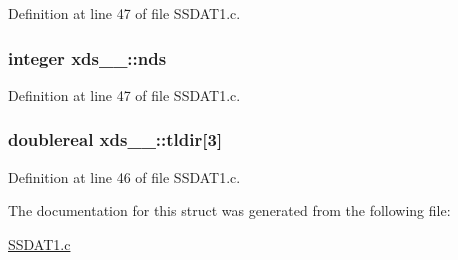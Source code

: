 Definition at line 47 of file S\+S\+D\+A\+T1.\+c.

\subsubsection[{\texorpdfstring{nds}{nds}}]{\setlength{\rightskip}{0pt plus 5cm}integer xds\+\_\+\_\+\+::nds}\hypertarget{structxds__1___aee71452b69897fed2585126ac7b9c405}{}\label{structxds__1___aee71452b69897fed2585126ac7b9c405}


Definition at line 47 of file S\+S\+D\+A\+T1.\+c.

\subsubsection[{\texorpdfstring{tldir}{tldir}}]{\setlength{\rightskip}{0pt plus 5cm}doublereal xds\+\_\+\_\+\+::tldir\mbox{[}3\mbox{]}}\hypertarget{structxds__1___aa53640f173caddfcf7fb683cae6a6b03}{}\label{structxds__1___aa53640f173caddfcf7fb683cae6a6b03}


Definition at line 46 of file S\+S\+D\+A\+T1.\+c.



The documentation for this struct was generated from the following file\+:\begin{DoxyCompactItemize}
\item 
\hyperlink{SSDAT1_8c}{S\+S\+D\+A\+T1.\+c}\end{DoxyCompactItemize}
